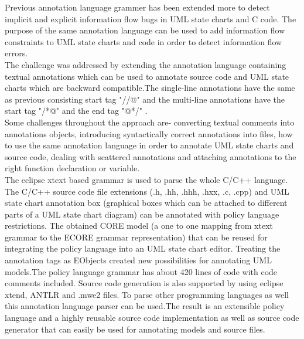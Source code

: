 Previous annotation language grammer has been extended more
to detect implicit and explicit information flow bugs in UML
state charts and C code. The purpose of the same annotation language
can be used to add information flow constraints to UML state
charts and code in order to detect information flow errors.\\

The challenge was addressed by extending the annotation language containing textual annotations which can be used to annotate source code and UML state charts which are backward compatible.The single-line annotations have the same as previous consisting start tag "//@" and the multi-line annotations have the start tag "/*@" and the end tag "@*/" .\\

Some challenges throughout the approach are- converting textual
comments into annotations objects, introducing syntactically
correct annotations into files, how to use the same annotation
language in order to annotate UML state charts and source
code, dealing with scattered annotations and attaching annotations to the right function declaration or variable.\\

The eclipse xtext based grammar is used to parse the whole C/C++ language. The C/C++ source code file extensions (.h, .hh, .hhh, .hxx, .c, .cpp) and UML state chart annotation box (graphical boxes
which can be attached to different parts of a UML state chart diagram) can be annotated with policy language restrictions. The obtained CORE model (a one to one mapping from xtext grammar to the ECORE grammar representation) that can be reused for integrating the policy language into an UML state chart editor. Treating the annotation tags as EObjects created new possibilities for annotating
UML models.The policy language grammar has about 420 lines of code with code comments included. Source code generation is also supported by using
eclipse xtend, ANTLR and .mwe2 files. To parse other programming languages as well this annotation language parser can be used.The result is an extensible policy language and a highly reusable source code implementation as well as source code generator that can easily be used for annotating models and source files.

